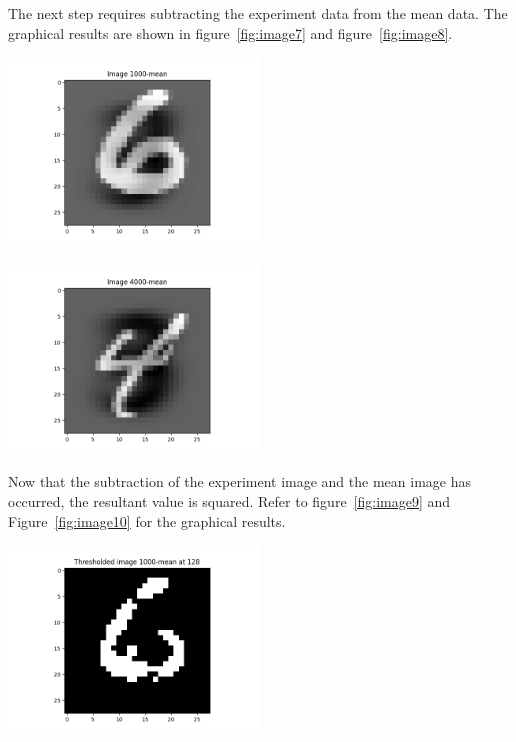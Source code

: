 The next step requires subtracting the experiment data from the mean data. The graphical results are shown in figure~\ref{fig:image7} and figure~\ref{fig:image8}.

\begin{center}
\includegraphics[width=0.5\textwidth]{image7.png}
\end{center}

\begin{center}
\includegraphics[width=0.5\textwidth]{image8.png}
\end{center}
Now that the subtraction of the experiment image and the mean image has occurred, the resultant value is squared. Refer to figure~\ref{fig:image9} and Figure~\ref{fig:image10} for the graphical results.
\begin{center}
\includegraphics[width=0.5\textwidth]{image9.png}
\end{center}

